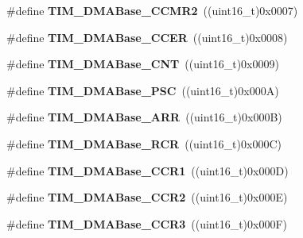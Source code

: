 \begin{DoxyCompactItemize}
\#define {\bfseries T\+I\+M\+\_\+\+D\+M\+A\+Base\+\_\+\+C\+C\+M\+R2}~((uint16\+\_\+t)0x0007)
\item 
\mbox{\label{group___t_i_m___d_m_a___base__address_ga6935639db5738662520e8d0eb7116dd6}} 
\#define {\bfseries T\+I\+M\+\_\+\+D\+M\+A\+Base\+\_\+\+C\+C\+ER}~((uint16\+\_\+t)0x0008)
\item 
\mbox{\label{group___t_i_m___d_m_a___base__address_gacab604257d144cf3a59b360cbc958ec9}} 
\#define {\bfseries T\+I\+M\+\_\+\+D\+M\+A\+Base\+\_\+\+C\+NT}~((uint16\+\_\+t)0x0009)
\item 
\mbox{\label{group___t_i_m___d_m_a___base__address_gab8dd06970f235fe9f6997e0975237388}} 
\#define {\bfseries T\+I\+M\+\_\+\+D\+M\+A\+Base\+\_\+\+P\+SC}~((uint16\+\_\+t)0x000\+A)
\item 
\mbox{\label{group___t_i_m___d_m_a___base__address_gaab8a66f70e59b5916b4bba344746d652}} 
\#define {\bfseries T\+I\+M\+\_\+\+D\+M\+A\+Base\+\_\+\+A\+RR}~((uint16\+\_\+t)0x000\+B)
\item 
\mbox{\label{group___t_i_m___d_m_a___base__address_ga97f9edceee5c99b32aaa2c6daf849b7d}} 
\#define {\bfseries T\+I\+M\+\_\+\+D\+M\+A\+Base\+\_\+\+R\+CR}~((uint16\+\_\+t)0x000\+C)
\item 
\mbox{\label{group___t_i_m___d_m_a___base__address_ga235a47fa47fd19594a111e6e48c0d5a2}} 
\#define {\bfseries T\+I\+M\+\_\+\+D\+M\+A\+Base\+\_\+\+C\+C\+R1}~((uint16\+\_\+t)0x000\+D)
\item 
\mbox{\label{group___t_i_m___d_m_a___base__address_ga0e2150dcd3afe31ecb793aa471b3b972}} 
\#define {\bfseries T\+I\+M\+\_\+\+D\+M\+A\+Base\+\_\+\+C\+C\+R2}~((uint16\+\_\+t)0x000\+E)
\item 
\mbox{\label{group___t_i_m___d_m_a___base__address_ga590c90085bd2b206b941dff2731fed74}} 
\#define {\bfseries T\+I\+M\+\_\+\+D\+M\+A\+Base\+\_\+\+C\+C\+R3}~((uint16\+\_\+t)0x000\+F)
\item 

\end{DoxyCompactItemize}
